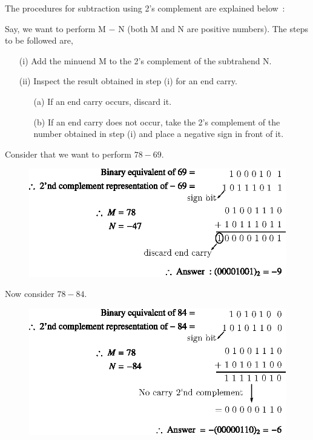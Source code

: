 
\smallskip
The procedures for subtraction using 2's complement are explained below~:

Say, we want to perform M $-$ N (both M and N are positive numbers). The steps to be followed are,
\begin{itemize}
\item[(i)] Add the minuend M to the 2's complement of the subtrahend N.

\item[(ii)] Inspect the result obtained in step (i) for an end carry.
\begin{itemize}
\item[(a)] If an end carry occurs, discard it.

\item[(b)] If an end carry does not occur, take the 2's complement of the number obtained in step (i) and place a negative sign in front of it.
\end{itemize}
\end{itemize}

Consider that we want to perform $78-69$.
\begin{figure}[H]
\centering
\includegraphics{chap5/div28.eps}
\end{figure}

Now consider $78-84$.
\begin{figure}[H]
\centering
\includegraphics{chap5/div29.eps}
\end{figure}

